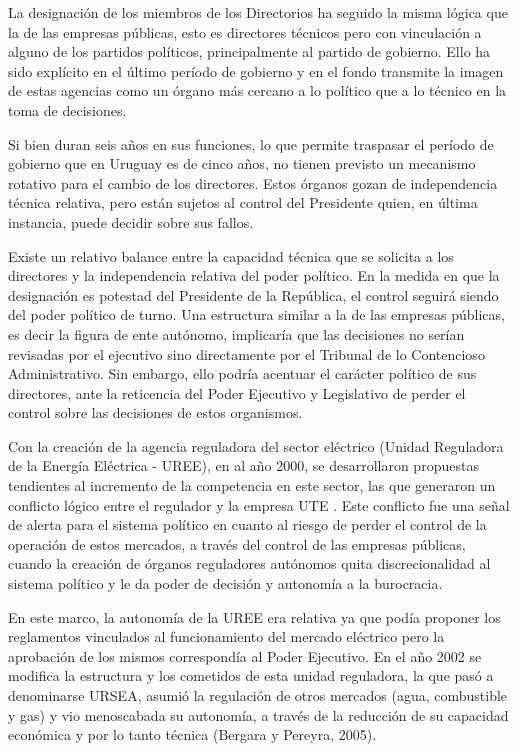 \documentclass[
  12pt,
  spanish,
]{book}
\begin{document}
La designación de los miembros de los Directorios ha seguido la misma lógica que la de las empresas públicas, esto es directores técnicos pero con vinculación a alguno de los partidos políticos, principalmente al partido de gobierno. Ello ha sido explícito en el último período de gobierno y en el fondo transmite la imagen de estas agencias como un órgano más cercano a lo político que a lo técnico en la toma de decisiones.

Si bien duran seis años en sus funciones, lo que permite traspasar el período de gobierno que en Uruguay es de cinco años, no tienen previsto un mecanismo rotativo para el cambio de los directores. Estos órganos gozan de independencia técnica relativa, pero están sujetos al control del Presidente quien, en última instancia, puede decidir sobre sus fallos.

Existe un relativo balance entre la capacidad técnica que se solicita a los directores y la independencia relativa del poder político. En la medida en que la designación es potestad del Presidente de la República, el control seguirá siendo del poder político de turno. Una estructura similar a la de las empresas públicas, es decir la figura de ente autónomo, implicaría que las decisiones no serían revisadas por el ejecutivo sino directamente por el Tribunal de lo Contencioso Administrativo. Sin embargo, ello podría acentuar el carácter político de sus directores, ante la reticencia del Poder Ejecutivo y Legislativo de perder el control sobre las decisiones de estos organismos.

Con la creación de la agencia reguladora del sector eléctrico (Unidad Reguladora de la Energía Eléctrica - UREE), en al año 2000, se desarrollaron propuestas tendientes al incremento de la competencia en este sector, las que generaron un conflicto lógico entre el regulador y la empresa UTE \citep{Bergara2005}. Este conflicto fue una señal de alerta para el sistema político en cuanto al riesgo de perder el control de la operación de estos mercados, a través del control de las empresas públicas, cuando la creación de órganos reguladores autónomos quita discrecionalidad al sistema político y le da poder de decisión y autonomía a la burocracia.

En este marco, la autonomía de la UREE era relativa ya que podía proponer los reglamentos vinculados al funcionamiento del mercado eléctrico pero la aprobación de los mismos correspondía al Poder Ejecutivo. En el año 2002 se modifica la estructura y los cometidos de esta unidad reguladora, la que pasó a denominarse URSEA, asumió la regulación de otros mercados (agua, combustible y gas) y vio menoscabada su autonomía, a través de la reducción de su capacidad económica y por lo tanto técnica (Bergara y Pereyra, 2005).
\end{document}
